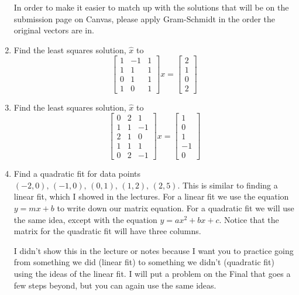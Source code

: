 \documentclass[reqno]{amsart}
\theoremstyle{definition}
\begin{document}
\begin{enumerate}
In order to make it easier to match up with the solutions that will be on the submission page on Canvas, please apply Gram-Schmidt in the order the original vectors are in.

\item  Find the least squares solution, $\hat{x}$ to
%
\begin{equation*}
\begin{bmatrix}
1 & -1 & 1\\
1 & 1 & 1\\
0 & 1 & 1\\
1 & 0 & 1
\end{bmatrix}x = \begin{bmatrix}
2\\
1\\
0\\
2
\end{bmatrix}
\end{equation*}

\item  Find the least squares solution, $\hat{x}$ to
%
\begin{equation*}
\begin{bmatrix}
0 & 2 & 1\\
1 & 1 & -1\\
2 & 1 & 0\\
1 & 1 & 1\\
0 & 2 & -1
\end{bmatrix}x = \begin{bmatrix}
1\\
0\\
1\\
-1\\
0
\end{bmatrix}
\end{equation*}

\item  Find a quadratic fit for data points $(-2, 0),\, (-1,0),\, (0,1),\, (1,2),\, (2,5)$.
This is similar to finding a linear fit, which I showed in the lectures.  For a linear fit
we use the equation $y = mx + b$ to write down our matrix equation.  For a quadratic fit
we will use the same idea, except with the equation $y = ax^2 + bx + c$.  Notice that the
matrix for the quadratic fit will have three columns.  

I didn't show this in the lecture or notes because I want you to practice going from something
we did (linear fit) to something we didn't (quadratic fit) using the ideas of the linear fit.
I will put a problem on the Final that goes a few steps beyond, but you can again use the same
ideas.


\end{enumerate}
\end{document}

